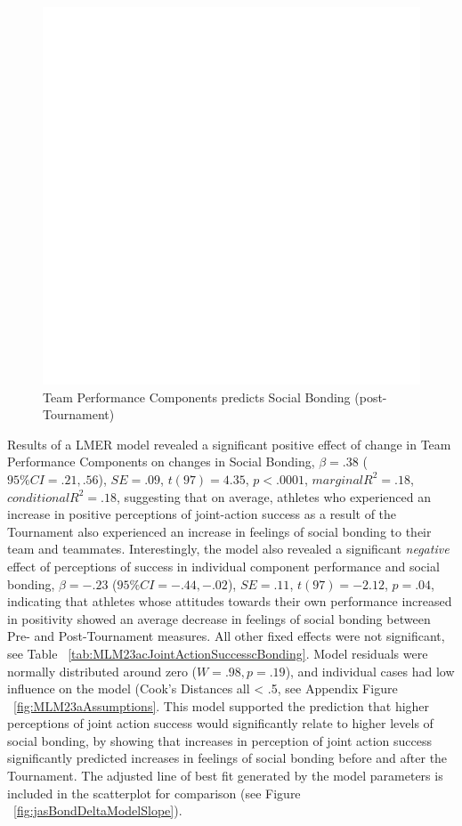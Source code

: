 \begin{CJK}{UTF8}{gbsn}
\begin{figure}[htbp]
  \centering
\includegraphics[scale=.5]{images/jasBondDeltaBasicXY.pdf}
  \caption{Team Performance Components predicts Social Bonding (post-Tournament)}
  \label{fig:jasBondDeltaBasicXY}
\end{figure}


Results of a LMER model revealed a significant positive effect of change in Team Performance Components on changes in Social Bonding, $\beta = .38$ ($95\% CI =  .21, .56$), $SE = .09$, $t(97) = 4.35$, $p < .0001$, $marginal R^2 = .18$, $conditional R^2 = .18$, suggesting that on average, athletes who experienced an increase in positive perceptions of joint-action success as a result of the Tournament also experienced an increase in feelings of social bonding to their team and teammates.  Interestingly, the model also revealed a significant \textit{negative} effect of perceptions of success in individual component performance and social bonding, $\beta = -.23$ ($95\% CI =  -.44, -.02$), $SE = .11$, $t(97) = -2.12$, $p = .04$, indicating that athletes whose attitudes towards their own performance increased in positivity showed an average decrease in feelings of social bonding between Pre- and Post-Tournament measures. All other fixed effects were not significant, see Table ~\ref{tab:MLM23acJointActionSuccesscBonding}. Model residuals were normally distributed around zero ($W = .98, p = .19$), and individual cases had low influence on the model (Cook's Distances all < .5, see Appendix Figure ~\ref{fig:MLM23aAssumptions}.  This model supported the prediction that higher perceptions of joint action success would significantly relate to higher levels of social bonding, by showing that increases in perception of joint action success significantly predicted increases in feelings of social bonding before and after the Tournament.  The adjusted line of best fit generated by the model parameters is included in the scatterplot for comparison (see Figure ~\ref{fig:jasBondDeltaModelSlope}).


\end{CJK}
